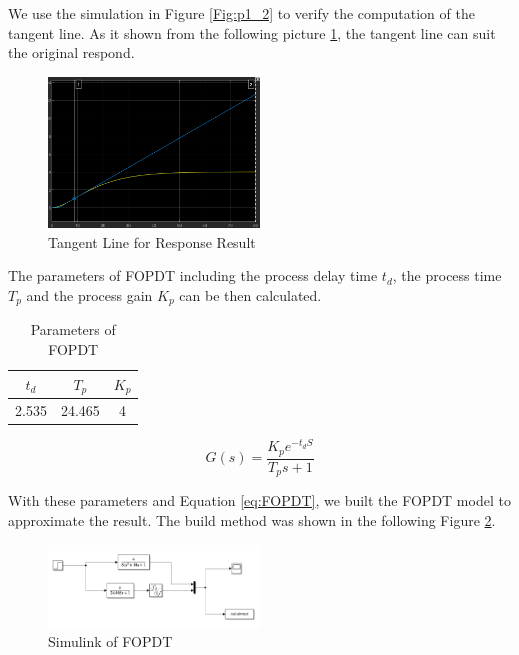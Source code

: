 \documentclass[11pt, a4paper]{article}
\begin{document}
We use the simulation in Figure \ref{Fig:p1_2} to verify the computation of the tangent line. As it shown from the following picture \ref{Fig:p1_2_r}, the tangent line can suit the original respond. 

\begin{figure}[htbp]     \begin{centering}
    \includegraphics[width=0.5\textwidth]{p1_2_r.png}
    \caption{\label{Fig:p1_2_r}Tangent Line for Response Result}
    \end{centering}
    
\end{figure}

The parameters of FOPDT including the process delay time $t_{d}$, the process time $T_{p}$ and the process gain $K_{p}$ can be then calculated.


\begin{table}[htbp]
\caption{Parameters of FOPDT}
\label{tab:para_1}
\begin{center}
\begin{tabular}{ccc}
\hline
 $t_{d}$      & $T_{p}$       & $K_{p}$   \\
\hline
 2.535         & 24.465          &  4         \\

\hline
\end{tabular}
\end{center}
\end{table}

\begin{equation}
G(s) = \frac{K_{p}e^{-t_{d}S}}{T_{p}s+1}
\label{eq:FOPDT}
\end{equation}

With these parameters and Equation \ref{eq:FOPDT}, we built the FOPDT model to approximate the result. The build method was shown in the following Figure \ref{Fig:p1_3}.

\begin{figure}[htbp]     \begin{centering}
    \includegraphics[width=0.5\textwidth]{p1_3.png}
    \caption{\label{Fig:p1_3}Simulink of FOPDT}
    \end{centering}
    
\end{figure}
\end{document}

